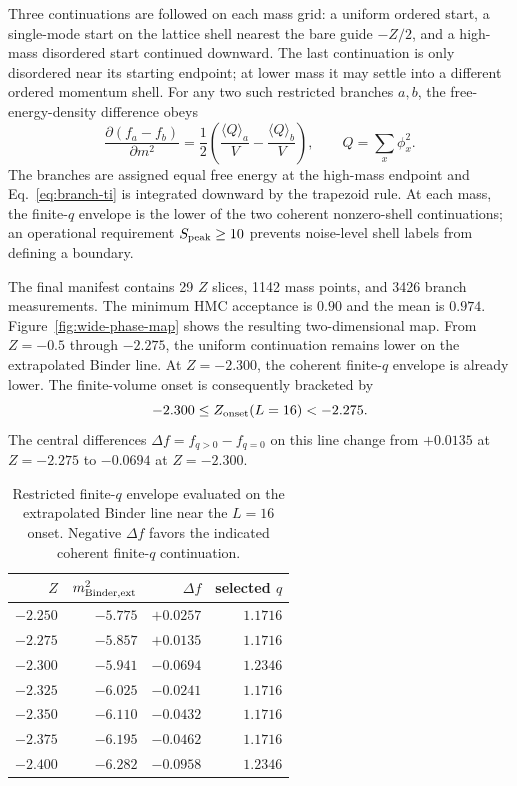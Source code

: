 \documentclass[11pt]{article}
\begin{document}
Three continuations are followed on each mass grid: a uniform ordered start,
a single-mode start on the lattice shell nearest the bare guide $-Z/2$, and a
high-mass disordered start continued downward.  The last continuation is only
disordered near its starting endpoint; at lower mass it may settle into a
different ordered momentum shell.  For any two such restricted branches
$a,b$, the free-energy-density difference obeys
\begin{equation}
  \frac{\partial(f_a-f_b)}{\partial m^2}
  =\frac{1}{2}\left(\frac{\langle Q\rangle_a}{V}
  -\frac{\langle Q\rangle_b}{V}\right),
  \qquad Q=\sum_x\phi_x^2.
  \label{eq:branch-ti}
\end{equation}
The branches are assigned equal free energy at the high-mass endpoint and
Eq.~\eqref{eq:branch-ti} is integrated downward by the trapezoid rule.  At each
mass, the finite-$q$ envelope is the lower of the two coherent nonzero-shell
continuations; an operational requirement $S_{\rm peak}\geq10$ prevents
noise-level shell labels from defining a boundary.

The final manifest contains 29 $Z$ slices, 1142 mass points, and 3426 branch
measurements.  The minimum HMC acceptance is $0.90$ and the mean is $0.974$.
Figure~\ref{fig:wide-phase-map} shows the resulting two-dimensional map.  From
$Z=-0.5$ through $-2.275$, the uniform continuation remains lower on the
extrapolated Binder line.  At $Z=-2.300$, the coherent finite-$q$ envelope is
already lower.  The finite-volume onset is consequently bracketed by
\begin{equation}
  -2.300 \leq Z_{\rm onset}(L=16) < -2.275.
  \label{eq:onset-bracket}
\end{equation}
The central differences $\Delta f=f_{q>0}-f_{q=0}$ on this line change from
$+0.0135$ at $Z=-2.275$ to $-0.0694$ at $Z=-2.300$.

\begin{table}[htbp]
  \centering
  \caption{Restricted finite-$q$ envelope evaluated on the extrapolated
  Binder line near the $L=16$ onset.  Negative $\Delta f$ favors the indicated
  coherent finite-$q$ continuation.}
  \label{tab:wide-onset}
  \begin{tabular}{rrrr}
    \toprule
    $Z$ & $m^2_{\rm Binder,ext}$ & $\Delta f$ & selected $q$ \\
    \midrule
    $-2.250$ & $-5.775$ & $+0.0257$ & $1.1716$ \\
    $-2.275$ & $-5.857$ & $+0.0135$ & $1.1716$ \\
    $-2.300$ & $-5.941$ & $-0.0694$ & $1.2346$ \\
    $-2.325$ & $-6.025$ & $-0.0241$ & $1.1716$ \\
    $-2.350$ & $-6.110$ & $-0.0432$ & $1.1716$ \\
    $-2.375$ & $-6.195$ & $-0.0462$ & $1.1716$ \\
    $-2.400$ & $-6.282$ & $-0.0958$ & $1.2346$ \\
    \bottomrule
  \end{tabular}
\end{table}
\end{document}

